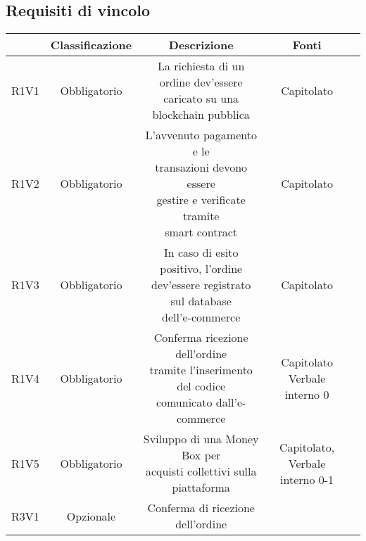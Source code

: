 \subsection{Requisiti di vincolo}
\begin{center}
	\renewcommand{\arraystretch}{1.8}
	\begin{longtable}[c]{c | c | c | c | p{5cm}}
		\rowcolor[HTML]{125E28}
		\multicolumn{1}{c}{\color[HTML]{FFFFFF} \textbf{Codice}} & 
		\multicolumn{1}{c}{\color[HTML]{FFFFFF} \textbf{Classificazione}} & 
		\multicolumn{1}{c}{\color[HTML]{FFFFFF} \textbf{Descrizione}} & 
		\multicolumn{1}{c}{\color[HTML]{FFFFFF} \textbf{Fonti}} \\
		\endhead
		R1V1 & Obbligatorio & \shortstack{La richiesta di un ordine dev'essere \\
                                        caricato su una blockchain pubblica} & Capitolato \\
        R1V2 & Obbligatorio & \shortstack{L'avvenuto pagamento e le \\
                                        transazioni devono essere \\ 
                                        gestire e verificate tramite \\ 
                                        smart contract} & Capitolato \\
        R1V3 & Obbligatorio & \shortstack{In caso di esito positivo, l'ordine\\
                                        dev'essere registrato sul database \\
                                        dell'e-commerce} & Capitolato \\
        R1V4 & Obbligatorio & \shortstack{Conferma ricezione dell'ordine \\
                                        tramite l'inserimento del codice \\
                                        comunicato dall'e-commerce} & \shortstack{Capitolato \\ Verbale interno 0} \\
        R1V5 & Obbligatorio & \shortstack{Sviluppo di una Money Box per \\
                                        acquisti collettivi sulla piattaforma} & \shortstack{Capitolato, \\ Verbale interno 0-1} \\
        R3V1 & Opzionale & \shortstack{Conferma di ricezione dell'ordine \\
}
\end{longtable}
\end{center}
